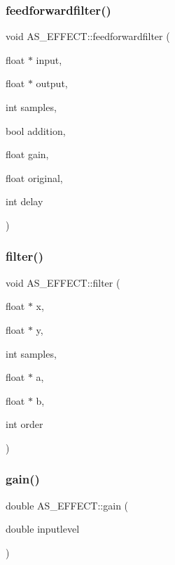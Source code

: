 \subsubsection{feedforwardfilter()}
{\footnotesize\ttfamily void A\+S\+\_\+\+E\+F\+F\+E\+C\+T\+::feedforwardfilter (\begin{DoxyParamCaption}\item[{float $\ast$}]{input,  }\item[{float $\ast$}]{output,  }\item[{int}]{samples,  }\item[{bool}]{addition,  }\item[{float}]{gain,  }\item[{float}]{original,  }\item[{int}]{delay }\end{DoxyParamCaption})}

\mbox{\label{class_a_s___e_f_f_e_c_t_a82260b295d4c57548c6a1a98ba063b8c}} 
\subsubsection{filter()}
{\footnotesize\ttfamily void A\+S\+\_\+\+E\+F\+F\+E\+C\+T\+::filter (\begin{DoxyParamCaption}\item[{float $\ast$}]{x,  }\item[{float $\ast$}]{y,  }\item[{int}]{samples,  }\item[{float $\ast$}]{a,  }\item[{float $\ast$}]{b,  }\item[{int}]{order }\end{DoxyParamCaption})}

\mbox{\label{class_a_s___e_f_f_e_c_t_ae29952b2bd61e59c62f95ac95160f82e}} 
\subsubsection{gain()}
{\footnotesize\ttfamily double A\+S\+\_\+\+E\+F\+F\+E\+C\+T\+::gain (\begin{DoxyParamCaption}\item[{double}]{inputlevel }\end{DoxyParamCaption})\hspace{0.3cm}{\ttfamily [private]}}


